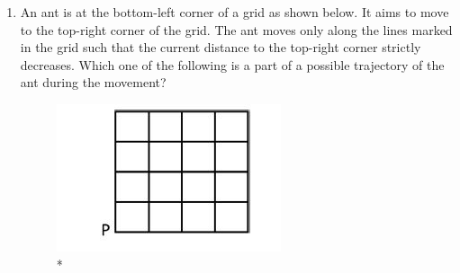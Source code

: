 \documentclass[journal,12pt,onecolumn]{IEEEtran}
\theoremstyle{remark}
\begin{document}
\begin{enumerate}
\item An ant is at the bottom-left corner of a grid  as shown below. It aims to move to the top-right corner of the grid. The ant moves only along the lines marked in the grid such that the current distance to the top-right corner strictly decreases. Which one of the following is a part of a possible trajectory of the ant during the movement?

\hfill{}


\begin{figure}[h!]
\centering
\includegraphics[width = 0.4\columnwidth]{figs/q10.png}
\caption{*}
\label{fig:placeholder}
\end{figure}

\begin{multicols}{2}
\begin{enumerate}


\end{enumerate}
\end{multicols}
\end{enumerate}
\end{document}
